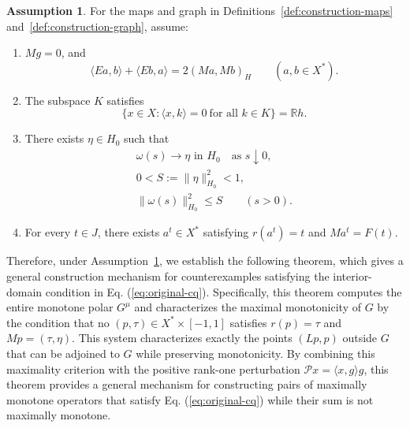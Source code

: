 \documentclass[11pt]{article}
\newcommand{\R}{\mathbb R}
\newcommand{\pair}[2]{\langle #1,#2\rangle}
\theoremstyle{definition}
\newtheorem{assumption}{Assumption}
\theoremstyle{remark}
\begin{document}
\begin{assumption}\label{ass:construction}
For the maps and graph in Definitions~\ref{def:construction-maps} and~\ref{def:construction-graph}, assume:
\begin{enumerate}
\renewcommand{\theenumi}{H\arabic{enumi}}
\renewcommand{\labelenumi}{(\theenumi)}
\item\label{ass:bilinear} $Mg=0$, and
\begin{equation}
\pair{Ea}{b}+\pair{Eb}{a}=2(Ma,Mb)_H
\qquad(a,b\in X^*).
\label{eq:abs-bilinear}
\end{equation}

\item\label{ass:annihilator} The subspace $K$ satisfies
\begin{equation}
\{x\in X:\pair{x}{k}=0\ \text{for all }k\in K\}=\R h.
\label{eq:abs-annihilator}
\end{equation}

\item\label{ass:curve-limit} There exists $\eta\in H_0$ such that
\begin{equation}
\begin{gathered}
\omega(s)\longrightarrow\eta\text{ in }H_0
\quad\text{as }s\downarrow0,\\
0<S:=\|\eta\|_{H_0}^2<1,\\
\|\omega(s)\|_{H_0}^2\le S\qquad(s>0).
\end{gathered}
\label{eq:abs-tail}
\end{equation}

\item\label{ass:realization} For every $t\in J$, there exists $a^t\in X^*$
satisfying $r(a^t)=t$ and $Ma^t=F(t)$.
\end{enumerate}
\end{assumption}




Therefore, under Assumption~\ref{ass:construction}, we establish the following theorem, which gives a general construction mechanism for counterexamples satisfying the interior-domain condition in Eq. (\ref{eq:original-cq}). Specifically, this theorem computes the entire monotone polar $G^\mu$ and characterizes the maximal monotonicity of $G$ by the condition that no $(p,\tau)\in X^*\times[-1,1]$ satisfies $r(p)=\tau$ and $Mp=(\tau,\eta)$.  This system characterizes exactly the points $(Lp,p)$ outside $G$ that can be adjoined to $G$ while preserving monotonicity. By combining this maximality criterion with the positive rank-one perturbation $\mathcal P x=\pair{x}{g}g$, this theorem provides a general mechanism for constructing pairs of maximally monotone operators that satisfy Eq. (\ref{eq:original-cq}) while their sum is not maximally monotone.
\end{document}
